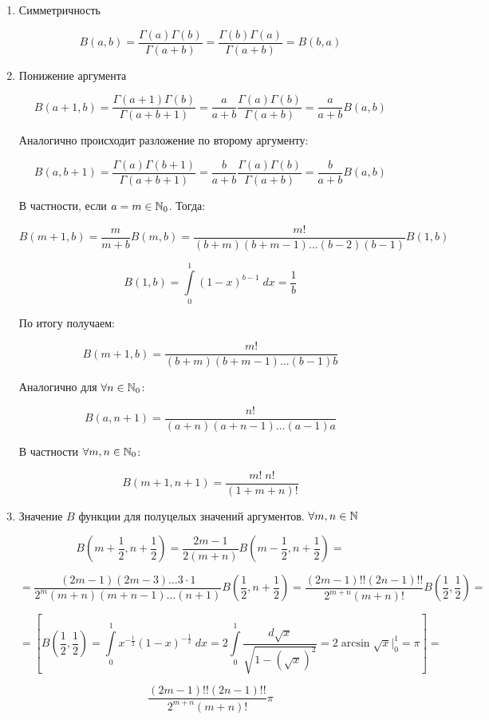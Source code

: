 \documentclass[../../main.tex]{subfiles}
\begin{document}
\begin{enumerate}
	\item Симметричность 
	
	\[  B(a,b) = \frac{\Gamma(a) \Gamma(b)}{\Gamma(a+b)} = \frac{\Gamma(b)  
	\Gamma(a) }{\Gamma(a+b)} = B(b,a)   \]
	
	\item Понижение аргумента
	
	\[   B(a+1,b) = \frac{\Gamma(a+1) \Gamma(b)}{\Gamma(a+b+1)}  = \frac{a}{a+b} 
	\frac{\Gamma(a) \Gamma(b)}{\Gamma(a+b)}  = \frac{a}{a+b}  B(a,b) \]
	
	Аналогично происходит разложение по второму аргументу:
	
	\[  B(a,b+1) =  \frac{\Gamma(a) \Gamma(b+1)}{\Gamma(a+b+1)}  = \frac{b}{a+b} 
	\frac{\Gamma(a) \Gamma(b)}{\Gamma(a+b)}  = \frac{b}{a+b}  B(a,b)   \]
	
	В частности, если $a=m \in \mathbb{N}_0$. Тогда:
	
	\[  B(m+1,b) = \frac{m}{m+b} B(m,b) = \frac{m!}{(b+m)(b+m-1)\dots(b-2)(b-1)} 
	B(1,b)  \]
	
	\[ B(1,b) = \int\limits_{0}^{1} \left( 1-x \right) ^{b-1} \; dx = \frac{1}{b} 
	\]
	
	По итогу получаем:
	
	\[  B(m+1,b) = \frac{m!}{(b+m)(b+m-1)\dots(b-1)b}     \]
	
	Аналогично для $\forall n \in \mathbb{N}_0$:
	
	\[  B(a,n+1) = \frac{n!}{(a+n)(a+n-1)\dots(a-1)a}  \]
	
	В частности $\forall m,n \in \mathbb{N}_0$:
	
	\[  B(m+1,n+1) = \frac{m! \; n!}{(1+m+n)!}   \]
	
	\item Значение $B$ функции для полуцелых значений аргументов. $\forall m,n 
	\in \mathbb{N}$
		
	\[  B\left( m+\frac{1}{2}, n+\frac{1}{2} \right) = \frac{2m - 1}{2(m+n)} 
	B\left( m-\frac{1}{2}, n+\frac{1}{2} \right) = \]
	
	\[ = \frac{(2m-1)(2m-3) \dots 3 \cdot 1}{2^m (m+n)(m+n-1)\dots (n+1)} B\left( 
	\frac{1}{2}, n+\frac{1}{2} \right) = \frac{(2m-1)!! (2n-1)!! }{2^{m+n} 
	(m+n)!} B\left( \frac{1}{2}, \frac{1}{2} \right) =  \]
	
	\[ = \left[  B\left( \frac{1}{2}, \frac{1}{2} \right) = \int\limits_{0}^{1} 
	x^{-\frac{1}{2}} \left( 1-x \right)^{-\frac{1}{2}} \; dx = 2 
	\int\limits_{0}^{1} \frac{d \sqrt{x} }{\sqrt{1 - \left(\sqrt{x} \right)^2 }} 
	= 2 \arcsin{\sqrt{x}} \bigg|_{0}^{1} = \pi  \right] =     \]
	
	\[   \frac{(2m-1)!! (2n-1)!! }{2^{m+n} (m+n)!} \pi    \]
\end{enumerate}
\end{document}

